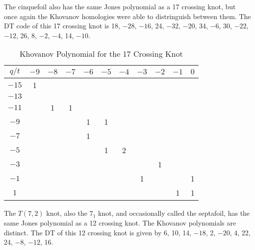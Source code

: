 \documentclass{article}
\theoremstyle{plain}
\begin{document}
        The cinquefoil also has the same Jones polynomial as a 17 crossing knot,
        but once again the Khovanov homologies were able to distringuish
        between them. The DT code of this 17 crossing knot is
        18, $-28$, $-16$, 24, $-32$, $-20$, 34, $-6$, 30, $-22$, $-12$, 26,
        8, $-2$, $-4$, 14, $-10$.
        \begin{table}[H]
            \centering
            \begin{tabular}{| c | c | c | c | c | c | c | c | c | c | c |}
                \hline
                $q/t$&$-9$&$-8$&$-7$&$-6$&$-5$&$-4$&$-3$&$-2$&$-1$&$0$\\
                \hline
                $-15$&1&&&&&&&&&\\
                \hline
                $-13$&&&&&&&&&&\\
                \hline
                $-11$&&1&1&&&&&&&\\
                \hline
                $-9$&&&&1&1&&&&&\\
                \hline
                $-7$&&&&1&&&&&&\\
                \hline
                $-5$&&&&&1&2&&&&\\
                \hline
                $-3$&&&&&&&&1&&\\
                \hline
                $-1$&&&&&&&1&&&1\\
                \hline
                $1$&&&&&&&&&1&1\\
                \hline
            \end{tabular}
            \caption{Khovanov Polynomial for the 17 Crossing Knot}
        \end{table}
        The $T(7,2)$ knot, also the $7_{1}$ knot, and occasionally called the
        septafoil, has the same Jones polynomial as a 12 crossing knot. The
        Khovanov polynomials are distinct. The DT of this 12 crossing knot is
        given by 6, 10, 14, $-18$, 2, $-20$, 4, 22, 24, $-8$, $-12$, 16.
\end{document}
